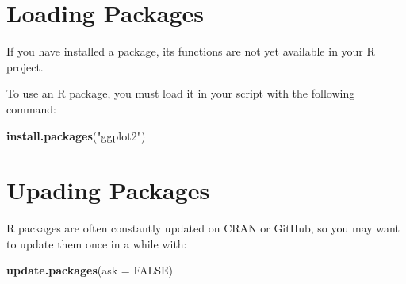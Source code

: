 \documentclass[
]{book}
\newenvironment{Shaded}{\begin{snugshade}}{\end{snugshade}}
\newcommand{\DataTypeTok}[1]{\textcolor[rgb]{0.13,0.29,0.53}{#1}}
\newcommand{\KeywordTok}[1]{\textcolor[rgb]{0.13,0.29,0.53}{\textbf{#1}}}
\newcommand{\NormalTok}[1]{#1}
\newcommand{\OtherTok}[1]{\textcolor[rgb]{0.56,0.35,0.01}{#1}}
\newcommand{\StringTok}[1]{\textcolor[rgb]{0.31,0.60,0.02}{#1}}
\begin{document}
\hypertarget{loading-packages}{%
\section{Loading Packages}\label{loading-packages}}

If you have installed a package, its functions are not yet available in your R project.

To use an R package, you must load it in your script with the following command:

\begin{Shaded}
\begin{Highlighting}[]
\KeywordTok{install.packages}\NormalTok{(}\StringTok{"ggplot2"}\NormalTok{)}
\end{Highlighting}
\end{Shaded}

\hypertarget{upading-packages}{%
\section{Upading Packages}\label{upading-packages}}

R packages are often constantly updated on CRAN or GitHub, so you may want to update them once in a while with:

\begin{Shaded}
\begin{Highlighting}[]
\KeywordTok{update.packages}\NormalTok{(}\DataTypeTok{ask =} \OtherTok{FALSE}\NormalTok{)}
\end{Highlighting}
\end{Shaded}

  
\end{document}
